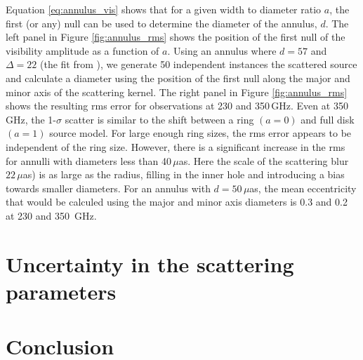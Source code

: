 \documentclass[11pt,preprint]{aastex}
\begin{document}
Equation \ref{eq:annulus_vis} shows that for a given width to diameter ratio 
$a$, the first (or any) null can be used to determine the diameter of the 
annulus, $d$.  The left panel in Figure \ref{fig:annulus_rms} shows the 
position of the first null of the visibility amplitude as a function of $a$.  
Using an annulus where $d = 57$ and $\Delta = 22$ (the fit from 
\citet[][]{doeleman08}), we generate 50 independent instances the scattered 
source and calculate a diameter using the
position of the first 
null along the major and minor axis of the scattering kernel.  The right panel
in Figure \ref{fig:annulus_rms} shows the resulting rms error for observations 
at 230 and 350$\,$GHz.  Even at 350$\,$GHz, the 1-$\sigma$ scatter is similar 
to the shift between a ring $(a=0)$ and full disk $(a=1)$ source model.  For
large enough ring sizes, the rms error appears to be independent of the ring
size.  However, there is a significant increase in the rms for annulli 
with diameters less than 40$\,\mu$as.  Here the scale of the scattering blur 
$22\,\mu$as) is as large as the radius, filling in the inner hole and 
introducing a bias towards smaller diameters.
For an annulus with $d=50\,\mu$as, the mean eccentricity that 
would be calculed using the major and minor axis diameters is 0.3 and 0.2 at 
230 and 350$\,$ GHz.




\begin{figure}[t!]
\end{figure}

\section{Uncertainty in the scattering parameters}

\section{Conclusion} \label{conclusion}

\acknowledgments 

\clearpage


\end{document}
